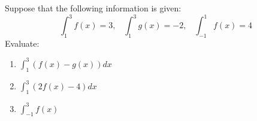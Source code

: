 \documentclass{ximera}
\begin{document}
\begin{exercise}
    Suppose that the following information is given: 
    $$\displaystyle \int_1^3 f(x)=3,\;\;\;\int_1^3 g(x)=-2,\;\;\; \int_{-1}^1 f(x)=4$$
    Evaluate:
    \begin{enumerate}
        \item $\displaystyle \int_1^3 (f(x)-g(x))dx$ %
        \item $\displaystyle \int_1^3 (2f(x)-4)dx$ %
        \item $\displaystyle \int_{-1}^3 f(x)$ %
    \end{enumerate}

\end{exercise}
\end{document}
